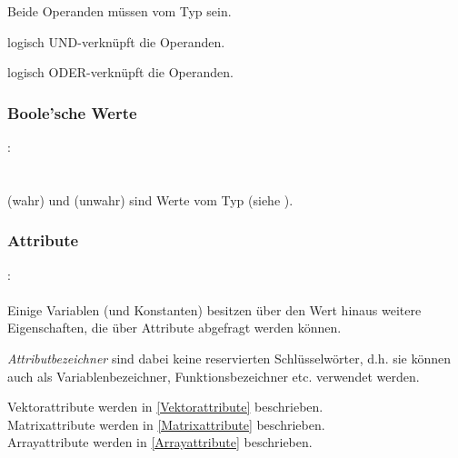 Beide Operanden müssen vom Typ  sein.

\op{\&\&} logisch UND-verknüpft die Operanden.

\op{||} logisch ODER-verknüpft die Operanden.


\subsubsection{Boole'sche Werte}\label{Boole'sche Werte}
:\label{asdr_konst_bool}\\
\hspace*{1cm}\glq{}\grq \\
\hspace*{1cm}\glq{}\grq \\

 (wahr) und  (unwahr) sind Werte vom Typ  (siehe ).


\subsubsection{Attribute}\label{Attribute}
:\label{attribut}\\
\hspace*{1cm} \\


Einige Variablen (und Konstanten) besitzen über den Wert hinaus weitere Eigenschaften, die
über Attribute abgefragt werden können.

\emph{Attributbezeichner} sind dabei keine reservierten
Schlüsselwörter, d.h. sie können auch als Variablenbezeichner, Funktionsbezeichner etc.
verwendet werden.

Vektorattribute werden in \ref{Vektorattribute} beschrieben.\\
Matrixattribute werden in \ref{Matrixattribute} beschrieben.\\
Arrayattribute werden in \ref{Arrayattribute} beschrieben.\\


